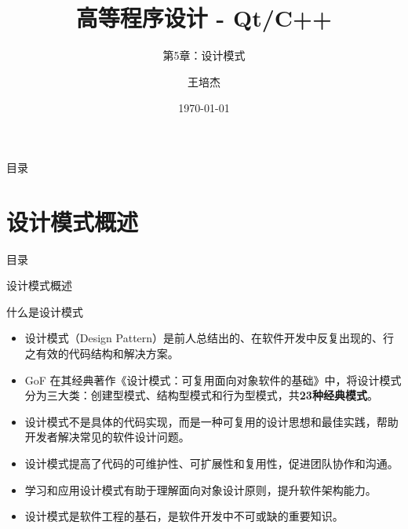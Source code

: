 \documentclass[UTF8,aspectratio=169]{beamer}
\title{高等程序设计 - Qt/C++}
\subtitle{第5章：设计模式}
\author{王培杰}
\institute{长江大学地球物理与石油资源学院}
\date{\today}
\begin{document}
\begin{frame}
    \titlepage
\end{frame}

\begin{frame}{目录}
    \begin{multicols}{2}
        \tableofcontents[hideothersubsections]
    \end{multicols}
\end{frame}

\section{设计模式概述}
\begin{frame}{目录}
    \begin{multicols}{2}
    \end{multicols}
\end{frame}

\begin{frame}{设计模式概述}
    \begin{ytublock}{什么是设计模式}
        \begin{itemize}
            \item 设计模式（Design Pattern）是前人总结出的、在软件开发中反复出现的、行之有效的代码结构和解决方案。
            \item GoF 在其经典著作《设计模式：可复用面向对象软件的基础》中，将设计模式分为三大类：创建型模式、结构型模式和行为型模式，共\textbf{23种经典模式}。
            \item 设计模式不是具体的代码实现，而是一种可复用的设计思想和最佳实践，帮助开发者解决常见的软件设计问题。
            \item 设计模式提高了代码的可维护性、可扩展性和复用性，促进团队协作和沟通。
            \item 学习和应用设计模式有助于理解面向对象设计原则，提升软件架构能力。
            \item 设计模式是软件工程的基石，是软件开发中不可或缺的重要知识。
        \end{itemize}
    \end{ytublock}
\end{frame}
\end{document}
